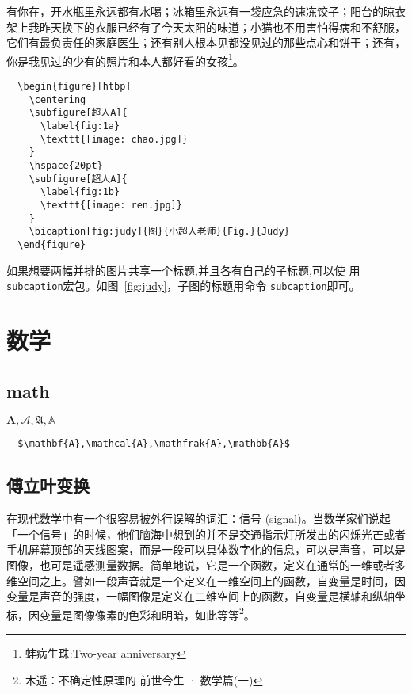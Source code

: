 有你在，开水瓶里永远都有水喝；冰箱里永远有一袋应急的速冻饺子；阳台的晾衣
架上我昨天换下的衣服已经有了今天太阳的味道；小猫也不用害怕得病和不舒服，
它们有最负责任的家庭医生；还有别人根本见都没见过的那些点心和饼干；还有，
你是我见过的少有的照片和本人都好看的女孩\footnote{蚌病生珠:Two-year
  anniversary}。


\begin{figure}[htbp]
  \centering
  \hspace{20pt}
\end{figure}

\begin{lstlisting}
  \begin{figure}[htbp]
    \centering
    \subfigure[超人A]{
      \label{fig:1a}
      \texttt{[image: chao.jpg]}
    }
    \hspace{20pt}
    \subfigure[超人A]{
      \label{fig:1b}
      \texttt{[image: ren.jpg]}
    }
    \bicaption[fig:judy]{图}{小超人老师}{Fig.}{Judy}
  \end{figure}
\end{lstlisting}

如果想要两幅并排的图片共享一个标题,并且各有自己的子标题,可以使
用\texttt{subcaption}宏包。如图~\ref{fig:judy}，子图的标题用命令
\texttt{subcaption}即可。

\section{数学}

\subsection{math}

$\mathbf{A},\mathcal{A},\mathfrak{A},\mathbb{A}$

\begin{lstlisting}
  $\mathbf{A},\mathcal{A},\mathfrak{A},\mathbb{A}$
\end{lstlisting}

\subsection{傅立叶变换}

在现代数学中有一个很容易被外行误解的词汇：信号 (signal)。当数学家们说起
「一个信号」的时候，他们脑海中想到的并不是交通指示灯所发出的闪烁光芒或者
手机屏幕顶部的天线图案，而是一段可以具体数字化的信息，可以是声音，可以是
图像，也可是遥感测量数据。简单地说，它是一个函数，定义在通常的一维或者多
维空间之上。譬如一段声音就是一个定义在一维空间上的函数，自变量是时间，因
变量是声音的强度，一幅图像是定义在二维空间上的函数，自变量是横轴和纵轴坐
标，因变量是图像像素的色彩和明暗，如此等等\footnote{木遥：不确定性原理的
  前世今生 · 数学篇(一)}。

